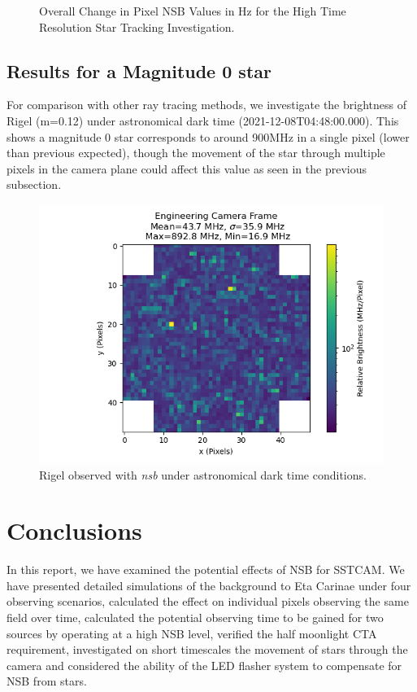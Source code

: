 \begin{figure}[ht]
\begin{minipage}{\linewidth}
\caption{Overall Change in Pixel NSB Values in Hz for the High Time Resolution Star Tracking Investigation.}

\end{minipage}
\label{fig:zenithpixelchange}
\end{figure} 

\subsection{Results for a Magnitude 0 star}
For comparison with other ray tracing methods, we investigate the brightness of Rigel (m=0.12) under astronomical dark time (2021-12-08T04:48:00.000). This shows a magnitude 0 star corresponds to around 900MHz in a single pixel (lower than previous expected), though the movement of the star through multiple pixels in the camera plane could affect this value as seen in the previous subsection.
\begin{figure}[h]
\begin{centering}
\includegraphics[width=0.7\columnwidth]{./figures/Hz_pixel_Rigel.png}
\caption{Rigel observed with \textit{nsb} under astronomical dark time conditions.}
\label{fig:rigel}
\end{centering}
\end{figure}
\section{Conclusions}

In this report, we have examined the potential effects of NSB for SSTCAM. We have presented detailed simulations of the background to Eta Carinae under four observing scenarios, calculated the effect on individual pixels observing the same field over time, calculated the potential observing time to be gained for two sources by operating at a high NSB level, verified the half moonlight CTA requirement, investigated on short timescales the movement of stars through the camera and considered the ability of the LED flasher system to compensate for NSB from stars.

